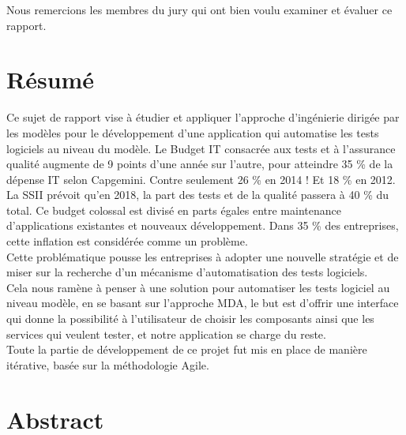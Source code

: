 \documentclass[
10pt, %
a4paper, %
oneside, %
headinclude,footinclude, %
BCOR5mm, %
]{article}
\begin{document}
Nous remercions les membres du jury qui ont bien voulu examiner et évaluer ce rapport.

\newpage
\section*{Résumé}

Ce sujet de rapport vise à étudier et appliquer l'approche d'ingénierie dirigée par les modèles pour le développement d’une application qui automatise les tests  logiciels au niveau du modèle.
Le Budget IT consacrée aux tests et à l’assurance qualité augmente de 9 points d’une année sur l’autre, pour atteindre 35 \% de la dépense IT selon Capgemini. Contre seulement 26 \% en 2014 ! Et 18 \% en 2012.\\

La SSII prévoit qu’en 2018, la part des tests et de la qualité passera à 40 \% du total. Ce budget colossal est divisé en parts égales entre maintenance d’applications existantes et nouveaux développement. Dans 35 \% des entreprises, cette inflation est considérée comme un problème.\\

Cette problématique pousse les entreprises à adopter une nouvelle stratégie et de miser sur la recherche d’un mécanisme d’automatisation des tests logiciels.\\

Cela nous ramène à penser à une solution pour automatiser les tests logiciel au niveau modèle, en se basant sur l’approche MDA, le but est d’offrir une interface qui donne la possibilité à l’utilisateur de choisir les composants ainsi que les services qui veulent tester, et notre application se charge du reste.\\

Toute la partie de développement de ce projet fut mis en place de manière itérative, basée sur la méthodologie Agile.

\section*{Abstract} %
\end{document}
